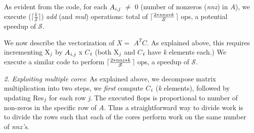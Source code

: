      \vspace*{-0.05in}
     As evident from the code, for each
     $A_{{\it{i}},{\it{j}}}$ $\neq$ 0 (number of nonzeros ({\it{nnz}}) in  $A$), 
     we execute ($\lceil$$\frac{k}{\mathcal{S}}$$\rceil$) 
     {\it{add}} (and {\it{mul}}) operations: total of
     $\lceil$$\frac{2*{\it{nnz}}*{\it{k}}}{\mathcal{S}}$$\rceil$ ops,
     a potential speedup of $\mathcal{S}$.  

     We now describe the vectorization of  $X =$ $A^TC$. %
     As explained above, this
     requires incrementing X$_{{\it{j}}}$ 
     by $A_{{\it{i}},{\it{j}}}$ x $C$$_{{\it{i}}}$ 
     (both X$_{{\it{j}}}$ and $C$$_{{\it{i}}}$ have {\it{k}} elements each.)
    We execute a similar code to perform 
    $\lceil$$\frac{2*{\it{nnz}}*{\it{k}}}{\mathcal{S}}$$\rceil$
    ops, a speedup of $\mathcal{S}$.

    \iffalse
    On some architectures, vector loads and stores are faster if
    memory addresses are 256-bit (or 512-bit aligned). 
    Since all our memory loads/stores start with each row of any
    matrix, we assign {\it{k}}  to be a multiple of 8, and align the
    starting addresses of all matrices to take advantage of such
    scenarios.
    \fi
    


     \vspace*{0.05in}
     {\it{2. Exploiting multiple cores}}: As explained above, we
     decompose matrix multiplication into two steps, %
     we {\it{first}} compute
     $C$$_{{\it{i}}}$ ({\it{k}} elements), followed by updating 
     Res$_{{\it{j}}}$ for each row {\it{j}}. The %
     executed 
     flops %
     is proportional to number of
     non-zeros in the specific row of $A$. Thus a straightforward way
     to divide work %
     is to divide the rows %
     such that each of the cores perform work on the same number of {\it{nnz's}}. 

